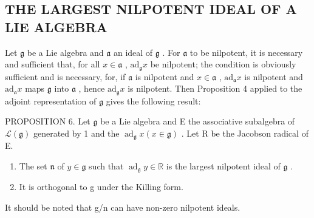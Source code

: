 \subsection{THE LARGEST NILPOTENT IDEAL OF A LIE ALGEBRA}

Let \(\mathfrak{g}\) be a Lie algebra and \(\mathfrak{a}\) an ideal of \(\mathfrak{g}\) . For \(\mathfrak{a}\) to be nilpotent, it is necessary and sufficient that, for all \(x \in \mathfrak{a}\) , \(\mathrm{ad}_{\mathfrak{g}}x\) be nilpotent; the condition is obviously sufficient and is necessary, for, if \(\mathfrak{a}\) is nilpotent and \(x \in \mathfrak{a}\) , \(\mathrm{ad}_{\mathfrak{a}}x\) is nilpotent and \(\mathrm{ad}_{\mathfrak{a}}x\) maps \(\mathfrak{g}\) into \(\mathfrak{a}\) , hence \(\mathrm{ad}_{\mathfrak{g}}x\) is nilpotent. Then Proposition 4 applied to the adjoint representation of \(\mathfrak{g}\) gives the following result:

PROPOSITION 6. Let \(\mathfrak{g}\) be a Lie algebra and E the associative subalgebra of \(\mathcal{L}(\mathfrak{g})\) generated by 1 and the \(\operatorname{ad}_{\mathfrak{g}}x(x\in \mathfrak{g})\) . Let R be the Jacobson radical of E.

\begin{enumerate}
\def\labelenumi{(\alph{enumi})}
\item
  The set \(\mathfrak{n}\) of \(y\in \mathfrak{g}\) such that \(\operatorname {ad}_{\mathfrak{g}}y\in \mathbb{R}\) is the largest nilpotent ideal of \(\mathfrak{g}\) .
\item
  It is orthogonal to g under the Killing form.
\end{enumerate}

It should be noted that g/n can have non-zero nilpotent ideals.

